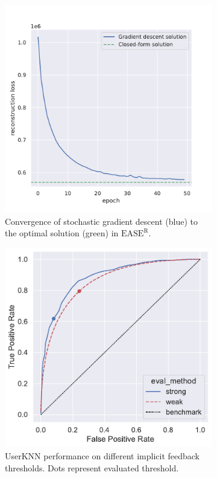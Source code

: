 \documentclass{article}
\newcommand{\easer}{$\text{EASE}^\text{R}$}
\newcommand{\userknn}{UserKNN\xspace}
\begin{document}
\begin{figure}[h]
	\centering
	\begin{subfigure}[b]{0.4\textwidth}
		\centering
		\includegraphics[width=\textwidth]{figures/recon-loss.pdf}
		\caption{Convergence of stochastic gradient descent (blue) to the optimal
		solution (green) in \easer.}
		\label{fig:convergence}
	\end{subfigure}
	\hspace{0.1\textwidth}
	\begin{subfigure}[b]{0.4\textwidth}
		\centering
		\includegraphics[width=\textwidth]{figures/user_knn_roc.pdf}
		\caption{\userknn performance on different implicit feedback thresholds. Dots represent evaluated threshold.}
	\end{subfigure}
	\caption{}
	\label{fig:1}
\end{figure}
\end{document}
